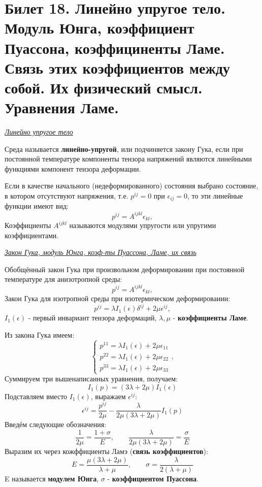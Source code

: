 \newpage
\section{Билет 18. Линейно упругое тело. Модуль Юнга, коэффициент Пуассона, коэффициненты Ламе. Связь этих коэффициентов между собой. Их физический смысл. Уравнения Ламе.}

\begin{center}
	\textit{\underline{Линейно упругое тело}}
\end{center}
\quad[Э-137]Среда называется \textbf{линейно-упругой}, или подчиняется закону Гука, если при постоянной температуре компоненты тензора напряжений являются линейными функциями компонент тензора деформации.

\quad Если в качестве начального (недеформированного) состояния выбрано состояние, в котором отсутствуют напряжения, т.е. $p^{ij}=0$ при $\epsilon_{ij}=0$, то эти линейные функции имеют вид: $$p^{ij}=A^{ijkl}\epsilon_{kl},$$
Коэффициенты $A^{ijkl}$ называются модулями упругости или упругими коэффициентами.

\begin{center}
	\textit{\underline{Закон Гука, модуль Юнга, коэф-ты Пуассона, Ламе, их связь}}
\end{center}


\quad Обобщённый закон Гука при произвольном деформировании при постоянной температуре для анизотропной среды: $$p^{ij}=A^{ijkl}\epsilon_{kl},$$
\quad Закон Гука для изотропной среды при изотермическом деформироваиии: $$p^{ij} = \lambda I_1(\epsilon)\delta^{ij}+2\mu \epsilon^{ij},$$
$I_1(\epsilon)$ - первый инвариант тензора деформаций, $\lambda, \mu$ - \textbf{коэффициенты Ламе}.

Из закона Гука имеем:
$$ \begin{cases}
p^{11} = \lambda I_1(\epsilon) + 2 \mu \epsilon_{11}\\
p^{22} = \lambda I_1(\epsilon) + 2 \mu \epsilon_{22}\\
p^{33} = \lambda I_1(\epsilon) + 2 \mu \epsilon_{33}
\end{cases},$$
Суммируем три вышенаписанных уравнения, получаем: $$I_1(p) = (3\lambda + 2\mu)I_1(\epsilon)  $$
Подставляем вместо $I_1(\epsilon)$, выражаем $\epsilon^{ij}$: $$\epsilon^{ij} = \frac{p^{ij}}{2\mu} - \frac{\lambda}{2\mu (3\lambda + 2\mu)}I_1(p)$$
Введём следующие обозначения: $$\frac{1}{2\mu} = \frac{1+\sigma}{E}, \qquad \frac{\lambda}{2\mu (3\lambda + 2\mu)}=\frac{\sigma}{E}$$
Выразим их через кожффициенты Ламэ (\textbf{связь коэффициентов}): $$E = \frac{\mu(3\lambda + 2\mu)}{\lambda + \mu}, \qquad \sigma = \frac{\lambda}{2(\lambda + \mu)}$$
E называется \textbf{модулем Юнга}, $\sigma$ - \textbf{коэффициентом Пуассона}.


